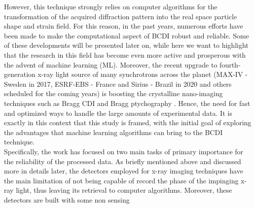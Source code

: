However, this technique strongly relies on computer algorithms for the transformation of the acquired diffraction pattern into 
the real space particle shape and strain field. For this reason, in the past years, numerous efforts have been made  
to make the computational aspect of BCDI robust and reliable. Some of these developments will be presented later on, while 
here we want to highlight that the research in this field has become even more active and prosperous with the advent of machine 
learning (ML). Moreover, the recent upgrade to fourth-generation x-ray light source of many synchrotrons across the planet 
(MAX-IV - Sweden in 2017, ESRF-EBS - France and Sirius - Brazil in 2020 and others scheduled for the coming years) is 
boosting the crystalline nano-imaging techniques such as Bragg CDI and Bragg ptychography \cite{Li2022, Leake:il5024}. 
Hence, the need for fast and optimized ways to handle the large amounts of experimental data. It is exactly in this context 
that this study is framed, with the initial goal of exploring the advantages that machine learning algorithms can bring 
to the BCDI technique. \\
Specifically, the work has focused on two main tasks of primary importance for the reliability of the processed data. 
As briefly mentioned above and discussed more in details later, the detectors employed for x-ray imaging techniques 
have the main limitation of not being capable of record the phase of the impinging x-ray light, thus leaving its retrieval 
to computer algorithms. Moreover, these detectors are built with some non sensing 



